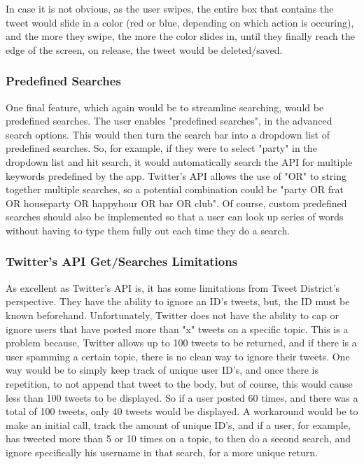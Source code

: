 \documentclass[11pt]{article}
\begin{document}
In case it is not obvious, as the user swipes, the entire box that contains the tweet would slide in a color (red or blue, depending on which action is occuring), and the more they swipe, the more the color slides in, until they finally reach the edge of the screen, on release, the tweet would be deleted/saved.

\subsubsection{Predefined Searches}

One final feature, which again would be to streamline searching, would be predefined searches. The user enables "predefined searches", in the advanced search options. This would then turn the search bar into a dropdown list of predefined searches. So, for example, if they were to select "party" in the dropdown list and hit search, it would automatically search the API for multiple keywords predefined by the app. Twitter's API allows the use of "OR" to string together multiple searches, so a potential combination could be "party OR frat OR houseparty OR happyhour OR bar OR club". Of course, custom predefined searches should also be implemented so that a user can look up series of words without having to type them fully out each time they do a search.



\subsubsection{Twitter's API Get/Searches Limitations}

As excellent as Twitter's API is, it has some limitations from Tweet District's perspective. They have the ability to ignore an ID's tweets, but, the ID must be known beforehand. Unfortunately, Twitter does not have the ability to cap or ignore users that have posted more than "x" tweets on a specific topic. This is a problem because, Twitter allows up to 100 tweets to be returned, and if there is a user spamming a certain topic, there is no clean way to ignore their tweets. One way would be to simply keep track of unique user ID's, and once there is repetition, to not append that tweet to the body, but of course, this would cause less than 100 tweets to be displayed. So if a user posted 60 times, and there was a total of 100 tweets, only 40 tweets would be displayed. A workaround would be to make an initial call, track the amount of unique ID's, and if a user, for example, has tweeted more than 5 or 10 times on a topic, to then do a second search, and ignore specifically his username in that search, for a more unique return.
\end{document}
